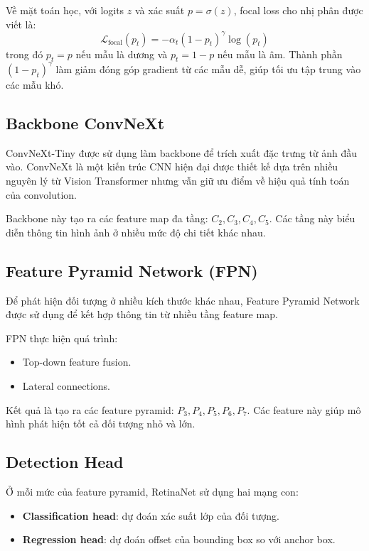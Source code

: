 \documentclass[12pt,a4paper]{article}
\begin{document}
Về mặt toán học, với logits $z$ và xác suất $p=\sigma(z)$, focal loss cho nhị phân được viết là:
\[
\mathcal{L}_{\text{focal}}(p_t)=-\alpha_t(1-p_t)^\gamma\log(p_t)
\]
trong đó $p_t=p$ nếu mẫu là dương và $p_t=1-p$ nếu mẫu là âm. Thành phần $(1-p_t)^\gamma$ làm giảm đóng góp gradient từ các mẫu dễ, giúp tối ưu tập trung vào các mẫu khó.

\subsection{Backbone ConvNeXt}

ConvNeXt-Tiny được sử dụng làm backbone để trích xuất đặc trưng từ ảnh đầu vào. ConvNeXt là một kiến trúc CNN hiện đại được thiết kế dựa trên nhiều nguyên lý từ Vision Transformer nhưng vẫn giữ ưu điểm về hiệu quả tính toán của convolution.

Backbone này tạo ra các feature map đa tầng: $C_2, C_3, C_4, C_5$. Các tầng này biểu diễn thông tin hình ảnh ở nhiều mức độ chi tiết khác nhau.

\subsection{Feature Pyramid Network (FPN)}

Để phát hiện đối tượng ở nhiều kích thước khác nhau, Feature Pyramid Network được sử dụng để kết hợp thông tin từ nhiều tầng feature map.

FPN thực hiện quá trình:
\begin{itemize}
    \item Top-down feature fusion.
    \item Lateral connections.
\end{itemize}

Kết quả là tạo ra các feature pyramid: $P_3, P_4, P_5, P_6, P_7$. Các feature này giúp mô hình phát hiện tốt cả đối tượng nhỏ và lớn.

\subsection{Detection Head}

Ở mỗi mức của feature pyramid, RetinaNet sử dụng hai mạng con:
\begin{itemize}
    \item \textbf{Classification head}: dự đoán xác suất lớp của đối tượng.
    \item \textbf{Regression head}: dự đoán offset của bounding box so với anchor box.
\end{itemize}
\end{document}
